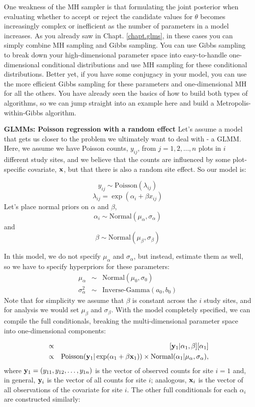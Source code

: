 One weakness of the MH sampler is that formulating the joint posterior
when evaluating whether to accept or reject the candidate values for
$\theta$ becomes increasingly complex or inefficient as the number of
parameters in a model increases. As you already saw in Chapt. \ref{chapt.glms}, in
these cases you can simply combine MH sampling and Gibbs sampling. You
can use Gibbs sampling to break down your high-dimensional parameter
space into easy-to-handle one-dimensional conditional distributions
and use MH sampling for these conditional distributions. Better yet,
if you have some conjugacy in your model, you can use the more
efficient Gibbs sampling for these parameters and one-dimensional MH
for all the others. You have already seen the basics of how to build
both types of algorithms, so we can jump straight into an example here
and build a Metropolis-within-Gibbs algorithm.

{\flushleft \bf  GLMMs: Poisson regression with a random effect }
Let's assume a model that gets us closer to the problem we ultimately
want to deal with - a GLMM. Here, we assume we have Poisson counts,
$y_{ij}$, from $j=1,2,\ldots,n$ plots in $i$ different study sites,
and we believe that the counts are influenced by some plot-specific
covariate, ${\bf x}$, but that there is also a random site effect. So
our model is:

\[
y_{ij} \sim \mbox{Poisson}(\lambda_{ij})
\]
\[
\lambda_{ij} = \exp (\alpha_i + \beta x_{ij})
\]
Let's place normal priors on $\alpha$ and $\beta$,  \[
\alpha_i \sim \mbox{Normal} (\mu_{\alpha}, \sigma_{\alpha})
\]
and
\[
\beta \sim \mbox{Normal} (\mu_{\beta}, \sigma_{\beta})
\]

In this model, we do not specify $\mu_{\alpha}$ and $\sigma_{\alpha}$, but instead, estimate them as well, so we have
to specify hyperpriors for these parameters:
\begin{eqnarray*}
\mu_{\alpha}  &\sim &  \mbox{Normal}(\mu_0, \sigma_0)  \\
\sigma_{\alpha}^2 & \sim & \mbox{Inverse-Gamma}(a_0, b_0)
\end{eqnarray*}
Note that for simplicity we assume that $\beta$ is constant across the $i$ study sites, and for analysis we would set $\mu_{\beta}$ and $\sigma_{\beta}$.
With the model completely specified, we can compile the full conditionals,
breaking the multi-dimensional parameter space into one-dimensional
components:

\begin{eqnarray*}
[\alpha_1|\alpha_2,\alpha_3,\ldots,\alpha_i,\beta,{\bf y}_{1}] & \propto &   [{\bf y}_{1}|\alpha_1,\beta]  [\alpha_1] \\
	 & \propto  &   \mbox{Poisson}({\bf y}_{1}| \exp(\alpha_1 + \beta {\bf x}_1)) \times \mbox{Normal}(\alpha_1|\mu_{\alpha} , \sigma_{\alpha}),
\end{eqnarray*}
where ${\bf y}_{1} = (y_{11},y_{12}, \ldots, y_{1n})$ is the vector of
observed counts for site $i=1$ and, in general, ${\bf y}_{i}$ is the
vector of all counts for site $i$; analogous, ${\bf x}_{i}$ is the
vector of all observations of the covariate for site $i$. The other full conditionals for
each $\alpha_{i}$ are constructed similarly:

